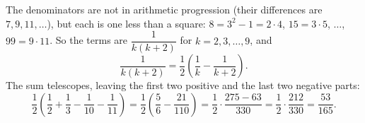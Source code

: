 The denominators are not in arithmetic progression (their differences are $7,9,11,\dots$), but each is one less than a square: $8=3^2-1=2\cdot4$, $15=3\cdot5$, $\dots$, $99=9\cdot11$. So the terms are $\dfrac{1}{k(k+2)}$ for $k=2,3,\dots,9$, and
\[\dfrac{1}{k(k+2)}=\dfrac{1}{2}\left(\dfrac{1}{k}-\dfrac{1}{k+2}\right).\]
The sum telescopes, leaving the first two positive and the last two negative parts:
\[\dfrac{1}{2}\left(\dfrac{1}{2}+\dfrac{1}{3}-\dfrac{1}{10}-\dfrac{1}{11}\right)=\dfrac{1}{2}\left(\dfrac{5}{6}-\dfrac{21}{110}\right)=\dfrac{1}{2}\cdot\dfrac{275-63}{330}=\dfrac{1}{2}\cdot\dfrac{212}{330}=\boxed{\dfrac{53}{165}}.\]
